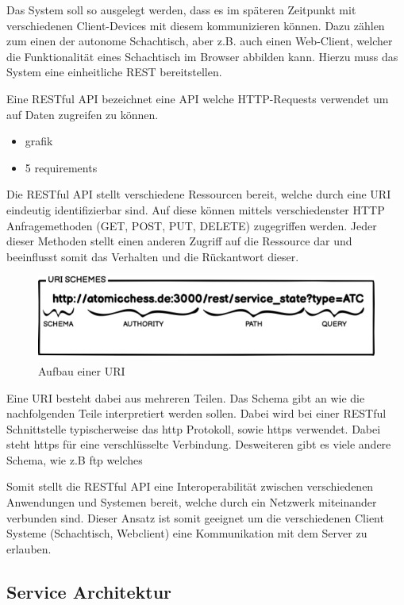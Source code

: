 Das System soll so ausgelegt werden, dass es im späteren Zeitpunkt mit
verschiedenen Client-Devices mit diesem kommunizieren können. Dazu
zählen zum einen der autonome Schachtisch, aber z.B. auch einen
Web-Client, welcher die Funktionalität eines Schachtisch im Browser
abbilden kann. Hierzu muss das System eine einheitliche REST
bereitstellen.

Eine RESTful API bezeichnet eine API welche HTTP-Requests verwendet um
auf Daten zugreifen zu können.

\begin{itemize}
\tightlist
\item
  grafik
\item
  5 requirements
\end{itemize}

Die RESTful API stellt verschiedene Ressourcen bereit, welche durch eine
URI eindeutig identifizierbar sind. Auf diese können mittels
verschiedenster HTTP Anfragemethoden (GET, POST, PUT, DELETE)
zugegriffen werden. Jeder dieser Methoden stellt einen anderen Zugriff
auf die Ressource dar und beeinflusst somit das Verhalten und die
Rückantwort dieser.

\begin{figure}
\centering
\includegraphics{images/ATC_URI_SCHEMES.png}
\caption{Aufbau einer URI}
\end{figure}

Eine URI besteht dabei aus mehreren Teilen. Das Schema gibt an wie die
nachfolgenden Teile interpretiert werden sollen. Dabei wird bei einer
RESTful Schnittstelle typischerweise das \gls{http} Protokoll, sowie
\gls{https} verwendet. Dabei steht \gls{https} für eine verschlüsselte
Verbindung. Desweiteren gibt es viele andere Schema, wie z.B \gls{ftp}
welches

Somit stellt die RESTful API eine Interoperabilität zwischen
verschiedenen Anwendungen und Systemen bereit, welche durch ein Netzwerk
miteinander verbunden sind. Dieser Ansatz ist somit geeignet um die
verschiedenen Client Systeme (Schachtisch, Webclient) eine Kommunikation
mit dem Server zu erlauben.

\hypertarget{service-architektur}{%
\subsection{Service Architektur}\label{service-architektur}}

